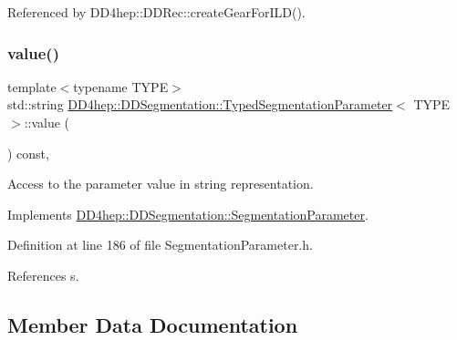 Referenced by D\+D4hep\+::\+D\+D\+Rec\+::create\+Gear\+For\+I\+L\+D().

\hypertarget{class_d_d4hep_1_1_d_d_segmentation_1_1_typed_segmentation_parameter_a07802b94c9a0fe56051a70d455d0dd9f}{}\label{class_d_d4hep_1_1_d_d_segmentation_1_1_typed_segmentation_parameter_a07802b94c9a0fe56051a70d455d0dd9f} 
\subsubsection{\texorpdfstring{value()}{value()}}
{\footnotesize\ttfamily template$<$typename T\+Y\+PE$>$ \\
std\+::string \hyperlink{class_d_d4hep_1_1_d_d_segmentation_1_1_typed_segmentation_parameter}{D\+D4hep\+::\+D\+D\+Segmentation\+::\+Typed\+Segmentation\+Parameter}$<$ T\+Y\+PE $>$\+::value (\begin{DoxyParamCaption}{ }\end{DoxyParamCaption}) const\hspace{0.3cm}{\ttfamily [inline]}, {\ttfamily [virtual]}}



Access to the parameter value in string representation. 



Implements \hyperlink{class_d_d4hep_1_1_d_d_segmentation_1_1_segmentation_parameter_a633dffe9e53306c5f67568ff5e567387}{D\+D4hep\+::\+D\+D\+Segmentation\+::\+Segmentation\+Parameter}.



Definition at line 186 of file Segmentation\+Parameter.\+h.



References s.



\subsection{Member Data Documentation}
\hypertarget{class_d_d4hep_1_1_d_d_segmentation_1_1_typed_segmentation_parameter_a91a6da96caf97f4c01828b98812d3e7f}{}\label{class_d_d4hep_1_1_d_d_segmentation_1_1_typed_segmentation_parameter_a91a6da96caf97f4c01828b98812d3e7f} 
